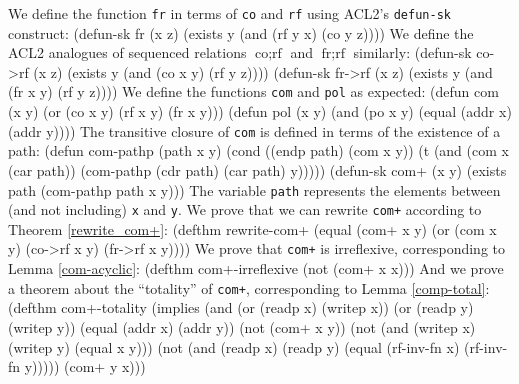 \documentclass[]{eptcs}
\newenvironment{qv}
{\quote\Verbatim}
{\endVerbatim\endquote}
\DeclareMathOperator{\corf}{co;rf}
\DeclareMathOperator{\frrf}{fr;rf}
\begin{document}
We define the function \verb|fr| in terms of \verb|co| and \verb|rf| using ACL2's \verb|defun-sk| construct:
\begin{qv}
(defun-sk fr (x z)
  (exists y
    (and (rf y x) (co y z))))
\end{qv}
We define the ACL2 analogues of sequenced relations $\corf$ and $\frrf$ similarly:
\begin{qv}
(defun-sk co->rf (x z)
  (exists y
    (and (co x y) (rf y z))))
(defun-sk fr->rf (x z)
  (exists y
    (and (fr x y) (rf y z))))
\end{qv}
We define the functions \verb|com| and \verb|pol| as expected:
\begin{qv}
(defun com (x y)
  (or (co x y)
      (rf x y)
      (fr x y)))
(defun pol (x y)
  (and (po x y)
       (equal (addr x) (addr y))))
\end{qv}
The transitive closure of \verb|com| is defined in terms of the existence of a path:
\begin{qv}
(defun com-pathp (path x y)
  (cond ((endp path) (com x y))
        (t (and (com x (car path))
                (com-pathp (cdr path) (car path) y)))))
(defun-sk com+ (x y)
  (exists path (com-pathp path x y)))
\end{qv}
The variable \verb|path| represents the elements between (and not including) \verb|x| and \verb|y|. We prove that we can rewrite \verb|com+| according to Theorem \ref{rewrite_com+}:
\begin{qv}
(defthm rewrite-com+
  (equal (com+ x y)
         (or (com x y)
             (co->rf x y)
             (fr->rf x y))))
\end{qv}
We prove that \verb|com+| is irreflexive, corresponding to Lemma \ref{com-acyclic}:
\begin{qv}
(defthm com+-irreflexive
  (not (com+ x x)))
\end{qv}
And we prove a theorem about the ``totality'' of \verb|com+|, corresponding to Lemma \ref{comp-total}:
\begin{qv}
(defthm com+-totality
  (implies (and (or (readp x) (writep x))
                (or (readp y) (writep y))
                (equal (addr x) (addr y))
                (not (com+ x y))
                (not (and (writep x)
                          (writep y)
                          (equal x y)))
                (not (and (readp x)
                          (readp y)
                          (equal (rf-inv-fn x) (rf-inv-fn y)))))
           (com+ y x)))
\end{qv}
\end{document}
